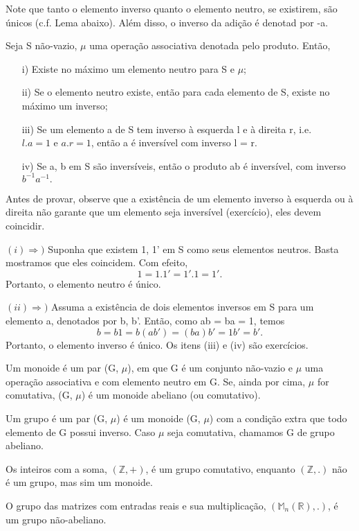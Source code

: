 \documentclass[Algebra/algebra_notes.tex]{subfiles}
\begin{document}
Note que tanto o elemento inverso quanto o elemento neutro, se existirem, são únicos (c.f. Lema abaixo). Além disso, o inverso da adição é
denotad por -a.
\begin{lemma*}
	Seja S não-vazio, $\mu$ uma operação associativa denotada pelo produto. Então,
	\begin{itemize}
		\item[i)] Existe no máximo um elemento neutro para S e $\mu$;
		\item[ii)] Se o elemento neutro existe, então para cada elemento de S, existe no máximo um inverso;
		\item[iii)] Se um elemento a de S tem inverso \`a esquerda l e \`a direita r, i.e. $l.a = 1 \text{ e } a.r = 1$, então
		      a é inversível com inverso l = r.
		\item[iv)] Se a, b em S são inversíveis, então o produto ab é inversível, com inverso $b^{-1}a^{-1}.$
	\end{itemize}
\end{lemma*}
Antes de provar, observe que a existência de um elemento inverso \`a esquerda ou \`a direita não garante que um elemento
seja inversível (exercício), eles devem coincidir.
\begin{proof*}
	$(i)\Rightarrow)$ Suponha que existem 1, 1' em S como seus elementos neutros. Basta mostramos que eles coincidem. Com efeito,
	$$
		1 = 1.1' = 1'.1 = 1'.
	$$
	Portanto, o elemento neutro é único.

	$(ii)\Rightarrow)$ Assuma a existência de dois elementos inversos em S para um elemento a, denotados por b, b'. Então, como
	ab = ba = 1, temos
	$$
		b = b1 = b(ab') = (ba)b' = 1b' = b'.
	$$
	Portanto, o elemento inverso é único. Os itens (iii) e (iv) são exercícios. \qedsymbol
\end{proof*}

\begin{def*}
	Um monoide é um par (G, $\mu$), em que G é um conjunto não-vazio e $\mu$ uma operação associativa e com elemento neutro em G.
	Se, ainda por cima, $\mu$ for comutativa, (G, $\mu$) \' e um monoide abeliano (ou comutativo).
\end{def*}
\begin{def*}
	Um grupo é um par (G, $\mu$) é um monoide (G, $\mu$) com a condição extra que todo elemento de G possui inverso. Caso
	$\mu$ seja comutativa, chamamos G de grupo abeliano.
\end{def*}
\begin{example*}
	Os inteiros com a soma, $(\mathbb{Z}, +)$, é um grupo comutativo, enquanto $(\mathbb{Z}, .)$ não é um grupo, mas sim um monoide.
\end{example*}
\begin{example*}
	O grupo das matrizes com entradas reais e sua multiplicação, $(\mathbb{M}_{n}(\mathbb{R}), .)$, é um grupo não-abeliano.
\end{example*}
\end{document}
